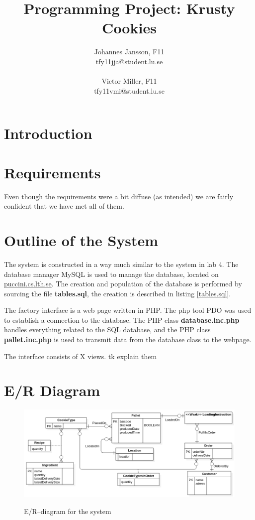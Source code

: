 \documentclass[a4paper]{scrartcl}
\numberwithin{equation}{section}
\begin{document}
\title{Programming Project: Krusty Cookies}
\author{Johannes Jansson, F11\\tfy11jja@student.lu.se\\\\Victor Miller, F11\\tfy11vmi@student.lu.se}

\date{}
\maketitle
\newpage

\section*{Introduction}
\section*{Requirements}
Even though the requirements were a bit diffuse (as intended) we are fairly confident that we have met all of them. 
\section*{Outline of the System}
The system is constructed in a way much similar to the system in lab 4. 
The database manager MySQL is used to manage the database, located on \url{puccini.cs.lth.se}. 
The creation and population of the database is performed by sourcing the file \textbf{tables.sql}, the creation is described in listing \ref{tables.sql}.

The factory interface is a web page written in PHP. 
The php tool PDO was used to establish a connection to the database. 
The PHP class \textbf{database.inc.php} handles everything related to the SQL database, and the PHP class \textbf{pallet.inc.php} is used to transmit data from the database class to the webpage.



The interface consists of X views. tk explain them
\section*{E/R Diagram}

\begin{figure}[h!]
  \begin{centering}
    \includegraphics[width=\textwidth]{../ER.png}
    \label{er-diagram}
    \caption{E/R--diagram for the system}
  \end{centering}
\end{figure}
\end{document}
